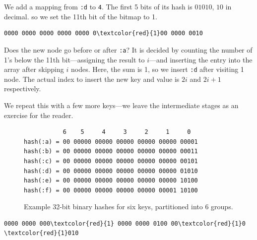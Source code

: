 \documentclass[preprint]{sigplanconf}
\begin{document}
We add a mapping from \texttt{:d} to \texttt{4}.
The first 5 bits of its hash is $01010$, $10$ in decimal.
so we set the 11th bit of the bitmap to 1.

\begin{Verbatim}[commandchars=\\\{\},codes={\catcode`$=3\catcode`^=7\catcode`_=8}]
0000 0000 0000 0000 0000 0\textcolor{red}{1}00 0000 0010
\end{Verbatim}


Does the new node go before or after \texttt{:a}?
It is decided by counting the number of 1's
below the 11th bit---assigning the result to $i$---and inserting the entry
into the array after skipping $i$ nodes.
Here, the sum is 1, so we insert \texttt{:d}
after visiting 1 node.
The actual index to insert the new key and value is
$2i$
and
$2i+1$
respectively.

We repeat this with a few more keys---we leave the intermediate
stages as an exercise for the reader.

\begin{figure}
  \begin{verbatim}
           6    5     4     3     2     1     0
hash(:a) = 00 00000 00000 00000 00000 00000 00001
hash(:b) = 00 00000 00000 00000 00000 00000 00011
hash(:c) = 00 00000 00000 00000 00000 00000 00101
hash(:d) = 00 00000 00000 00000 00000 00000 01010
hash(:e) = 00 00000 00000 00000 00000 00000 10100
hash(:f) = 00 00000 00000 00000 00000 00001 10100
  \end{verbatim}
  \label{hashes}
  \caption{Example 32-bit binary hashes for six keys, partitioned
    into 6 groups.}
\end{figure}


\begin{Verbatim}[commandchars=\\\{\},codes={\catcode`$=3\catcode`^=7\catcode`_=8}]
0000 0000 000\textcolor{red}{1} 0000 0000 0100 00\textcolor{red}{1}0 \textcolor{red}{1}010
\end{Verbatim}
\end{document}
